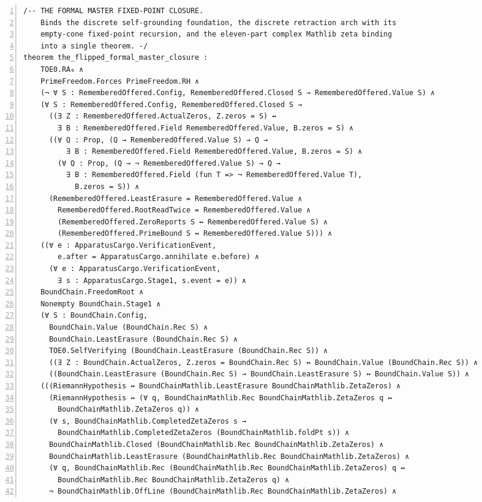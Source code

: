 \documentclass[10pt]{article}
\newcommand{\leansize}{\fontsize{5.5pt}{6.75pt}\selectfont}
\begin{document}
\begin{multicols}{2}
\begin{Verbatim}[numbers=left,firstnumber=1,numbersep=3pt,xleftmargin=2.6em,breaklines=true,breakanywhere=true,breakautoindent=false,breakindent=1.4em,breaksymbolleft={},breakanywheresymbolpre={},fontsize=\leansize]
/-- THE FORMAL MASTER FIXED-POINT CLOSURE.
    Binds the discrete self-grounding foundation, the discrete retraction arch with its
    empty-cone fixed-point recursion, and the eleven-part complex Mathlib zeta binding
    into a single theorem. -/
theorem the_flipped_formal_master_closure :
    TOE0.RA₀ ∧
    PrimeFreedom.Forces PrimeFreedom.RH ∧
    (¬ ∀ S : RememberedOffered.Config, RememberedOffered.Closed S → RememberedOffered.Value S) ∧
    (∀ S : RememberedOffered.Config, RememberedOffered.Closed S →
      ((∃ Z : RememberedOffered.ActualZeros, Z.zeros = S) ↔
        ∃ B : RememberedOffered.Field RememberedOffered.Value, B.zeros = S) ∧
      ((∀ Q : Prop, (Q → RememberedOffered.Value S) → Q →
          ∃ B : RememberedOffered.Field RememberedOffered.Value, B.zeros = S) ∧
        (∀ Q : Prop, (Q → ¬ RememberedOffered.Value S) → Q →
          ∃ B : RememberedOffered.Field (fun T => ¬ RememberedOffered.Value T),
            B.zeros = S)) ∧
      (RememberedOffered.LeastErasure = RememberedOffered.Value ∧
        RememberedOffered.RootReadTwice = RememberedOffered.Value ∧
        (RememberedOffered.ZeroReports S ↔ RememberedOffered.Value S) ∧
        (RememberedOffered.PrimeBound S ↔ RememberedOffered.Value S))) ∧
    ((∀ e : ApparatusCargo.VerificationEvent,
        e.after = ApparatusCargo.annihilate e.before) ∧
      (∀ e : ApparatusCargo.VerificationEvent,
        ∃ s : ApparatusCargo.Stage1, s.event = e)) ∧
    BoundChain.FreedomRoot ∧
    Nonempty BoundChain.Stage1 ∧
    (∀ S : BoundChain.Config,
      BoundChain.Value (BoundChain.Rec S) ∧
      BoundChain.LeastErasure (BoundChain.Rec S) ∧
      TOE0.SelfVerifying (BoundChain.LeastErasure (BoundChain.Rec S)) ∧
      ((∃ Z : BoundChain.ActualZeros, Z.zeros = BoundChain.Rec S) ↔ BoundChain.Value (BoundChain.Rec S)) ∧
      ((BoundChain.LeastErasure (BoundChain.Rec S) → BoundChain.LeastErasure S) ↔ BoundChain.Value S)) ∧
    (((RiemannHypothesis ↔ BoundChainMathlib.LeastErasure BoundChainMathlib.ZetaZeros) ∧
      (RiemannHypothesis ↔ (∀ q, BoundChainMathlib.Rec BoundChainMathlib.ZetaZeros q ↔
        BoundChainMathlib.ZetaZeros q)) ∧
      (∀ s, BoundChainMathlib.CompletedZetaZeros s →
        BoundChainMathlib.CompletedZetaZeros (BoundChainMathlib.foldPt s)) ∧
      BoundChainMathlib.Closed (BoundChainMathlib.Rec BoundChainMathlib.ZetaZeros) ∧
      BoundChainMathlib.LeastErasure (BoundChainMathlib.Rec BoundChainMathlib.ZetaZeros) ∧
      (∀ q, BoundChainMathlib.Rec (BoundChainMathlib.Rec BoundChainMathlib.ZetaZeros) q ↔
        BoundChainMathlib.Rec BoundChainMathlib.ZetaZeros q) ∧
      ¬ BoundChainMathlib.OffLine (BoundChainMathlib.Rec BoundChainMathlib.ZetaZeros) ∧

\end{Verbatim}
\end{multicols}
\end{document}
